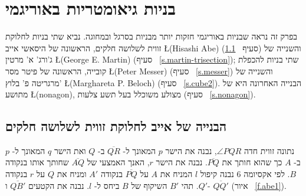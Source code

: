 

\chapter{בניות גיאומטריות באוריגמי}\label{c.origami-constructions}

בפרק זה נראה שבניות באוריגמי חזקות יותר מבניות בסרגל ובמחוגה. נביא שתי בניות לחלוקת זווית לשלושה חלקים, הראשונה של היסאשי אייב
\L{(Hisashi Abe)}
(סעיף%
~\ref{s.abe-trisection})
והשנייה של ג'ורג' א' מרטין
\L{(George E. Martin)}
(סעיף%
~\ref{s.martin-trisection});
שתי בניות להכפלת קובייה, הראשונה של פיטר מסר
\L{(Peter Messer)}
(סעיף%
~\ref{s.messer})
והשנייה של מרגריטה פ' בלוץ'
\L{(Marghareta P. Beloch)}
(סעיף%
~\ref{s.cube2}).
הבנייה האחרונה היא של מתושע
\L{(nonagon)},
מצולע משוכלל בעל תשע צלעות (סעיף%
~\ref{s.nonagon}).

\section{הבנייה של אייב לחלוקת זווית לשלושה חלקים}\label{s.abe-trisection}

נתונה זווית חדה
$\angle PQR$,
נבנה את הישר
$p$
המאונך ל-%
$\overline{QR}$
ב-%
$Q$
ואת הישר
$q$
המאונך ל-%
$p$
ב-%
$A$
כך שהוא חותך את
$\overline{PQ}$.
נבנה את הישר
$r$,
האנך האמצעי של
$\overline{AQ}$
שחותך אותו בנקודה
$B$.
לפי אקסיומה 
$6$
נבנה קיפול
$l$
המניח את 
$A$
על
$\overline{PQ}$ 
בנקודה
$A'$
ומניח את
$Q$
על
$r$
בנקודה
$Q'$.
תהי
$B'$
השיקוף של 
$B$
ביחס ל-%
$l$.
נבנה את הקטעים
$\overline{QB'}$
ו-%
$\overline{QQ'}$
(איור%
~\ref{f.abe1}).

